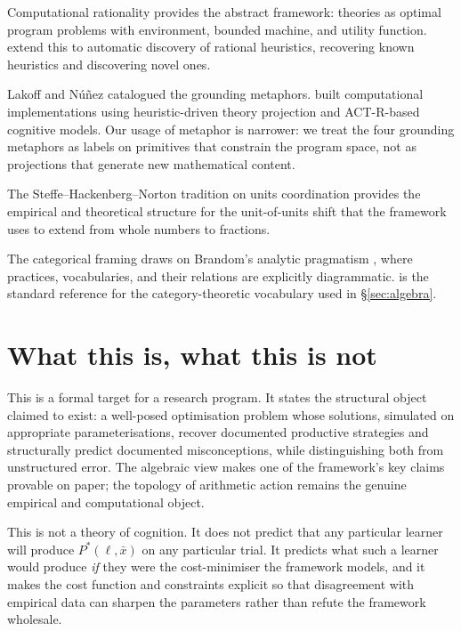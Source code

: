 \documentclass[11pt]{article}
\begin{document}
Computational rationality \parencite{lewis2014} provides the abstract
framework: theories as optimal program problems with environment,
bounded machine, and utility function. \textcite{lieder2021automatic}
extend this to automatic discovery of rational heuristics, recovering
known heuristics and discovering novel ones.

Lakoff and N\'u\~nez \parencite{lakoffNunez2000} catalogued the
grounding metaphors. \textcite{guhe2011blending,
guhe2009commutativity} built computational implementations using
heuristic-driven theory projection and ACT-R-based cognitive models.
Our usage of metaphor is narrower: we treat the four grounding
metaphors as labels on primitives that constrain the program space,
not as projections that generate new mathematical content.

The Steffe--Hackenberg--Norton tradition on units coordination
\parencite{steffeOlive2010, hackenberg2007, norton2012splitting,
confreySmith1995, olive1999, izsak2008} provides the empirical and
theoretical structure for the unit-of-units shift that the framework
uses to extend from whole numbers to fractions.

The categorical framing draws on Brandom's analytic pragmatism
\parencite{brandom1994making, brandom2008meaning}, where practices,
vocabularies, and their relations are explicitly diagrammatic.
\textcite{maclane1998} is the standard reference for the
category-theoretic vocabulary used in \S\ref{sec:algebra}.

\section{What this is, what this is not}

This is a formal target for a research program. It states the
structural object claimed to exist: a well-posed optimisation problem
whose solutions, simulated on appropriate parameterisations, recover
documented productive strategies and structurally predict documented
misconceptions, while distinguishing both from unstructured error.
The algebraic view makes one of the framework's key claims provable
on paper; the topology of arithmetic action remains the genuine
empirical and computational object.

This is not a theory of cognition. It does not predict that any
particular learner will produce $P^*(\ell, \bar{x})$ on any particular
trial. It predicts what such a learner would produce \emph{if} they
were the cost-minimiser the framework models, and it makes the cost
function and constraints explicit so that disagreement with empirical
data can sharpen the parameters rather than refute the framework
wholesale.
\end{document}
